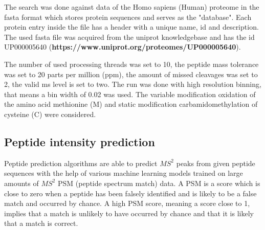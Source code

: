 \documentclass[11pt]{article}
\begin{document}
The search was done against data of the Homo sapiens (Human) proteome in the fasta format which stores protein sequences and serves as the "database". Each protein entry inside the file has a header with a unique name, id and description. The used fasta file was acquired from the uniprot knowledgebase and has the id UP000005640 (\textbf{https://www.uniprot.org/proteomes/UP000005640}).

The number of used processing threads was set to 10, the peptide mass tolerance was set to 20 parts per million (ppm), the amount of missed cleavages was set to 2, the valid ms level is set to two. The run was done with high resolution binning, that means a bin width of 0.02 was used. The variable modification oxidation of the amino acid methionine (M) and static modification carbamidomethylation of cysteine (C) were considered.

\subsection{Peptide intensity prediction}
Peptide prediction algorithms are able to predict \(MS^2\) peaks from given peptide sequences with the help of various machine learning models trained on large amounts of \(MS^2\) PSM (peptide spectrum match) data. A PSM is a score which is close to zero when a peptide has been falsely identified and is likely to be a false match and occurred by chance. A high PSM score, meaning a score close to 1, implies that a match is unlikely to have occurred by chance and that it is likely that a match is correct. 
\end{document}
